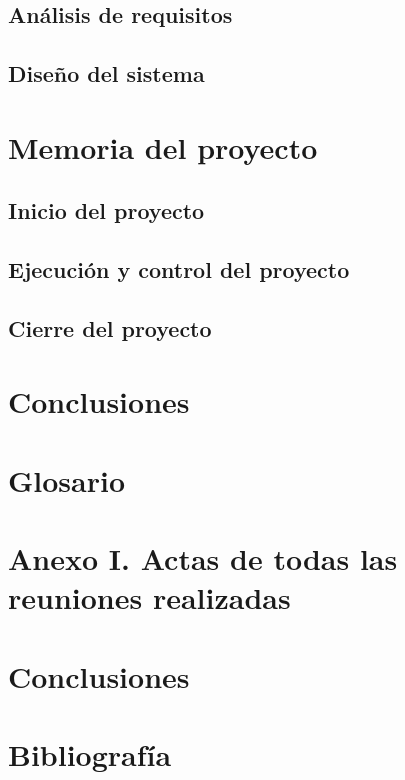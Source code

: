 \documentclass{article}
\begin{document}
\subsection{Análisis de requisitos}

\subsection{Diseño del sistema}

\section{Memoria del proyecto}

\subsection{Inicio del proyecto}

\subsection{Ejecución y control del proyecto}

\subsection{Cierre del proyecto}

\section{Conclusiones}

\section*{Glosario}

\section*{Anexo I. Actas de todas las reuniones realizadas}



\section{Conclusiones}

\section{Bibliografía}
\end{document}
